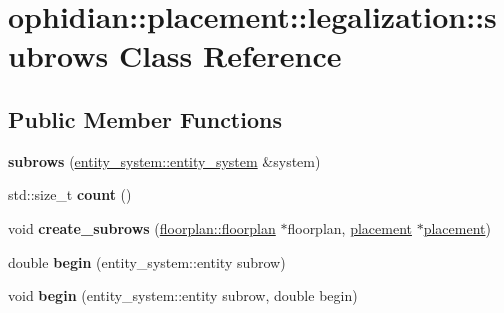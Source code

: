 \hypertarget{classophidian_1_1placement_1_1legalization_1_1subrows}{\section{ophidian\-:\-:placement\-:\-:legalization\-:\-:subrows Class Reference}
\label{classophidian_1_1placement_1_1legalization_1_1subrows}
}
\subsection*{Public Member Functions}
\begin{DoxyCompactItemize}
\item 
\hypertarget{classophidian_1_1placement_1_1legalization_1_1subrows_ad7fb47861ef9115a486c6d263f7b9e50}{{\bfseries subrows} (\hyperlink{classophidian_1_1entity__system_1_1entity__system}{entity\-\_\-system\-::entity\-\_\-system} \&system)}\label{classophidian_1_1placement_1_1legalization_1_1subrows_ad7fb47861ef9115a486c6d263f7b9e50}

\item 
\hypertarget{classophidian_1_1placement_1_1legalization_1_1subrows_a9d0f29f77f0bd00dff253456b6caca31}{std\-::size\-\_\-t {\bfseries count} ()}\label{classophidian_1_1placement_1_1legalization_1_1subrows_a9d0f29f77f0bd00dff253456b6caca31}

\item 
\hypertarget{classophidian_1_1placement_1_1legalization_1_1subrows_ab46dab03370310f4f07d5e445fdefa60}{void {\bfseries create\-\_\-subrows} (\hyperlink{classophidian_1_1floorplan_1_1floorplan}{floorplan\-::floorplan} $\ast$floorplan, \hyperlink{classophidian_1_1placement_1_1placement}{placement} $\ast$\hyperlink{classophidian_1_1placement_1_1placement}{placement})}\label{classophidian_1_1placement_1_1legalization_1_1subrows_ab46dab03370310f4f07d5e445fdefa60}

\item 
\hypertarget{classophidian_1_1placement_1_1legalization_1_1subrows_a9d7bca2a8ac756472c8a5d78ba8adb30}{double {\bfseries begin} (entity\-\_\-system\-::entity subrow)}\label{classophidian_1_1placement_1_1legalization_1_1subrows_a9d7bca2a8ac756472c8a5d78ba8adb30}

\item 
\hypertarget{classophidian_1_1placement_1_1legalization_1_1subrows_a1f7a99000a4c0b6a816024541515a194}{void {\bfseries begin} (entity\-\_\-system\-::entity subrow, double begin)}\label{classophidian_1_1placement_1_1legalization_1_1subrows_a1f7a99000a4c0b6a816024541515a194}


\end{DoxyCompactItemize}
